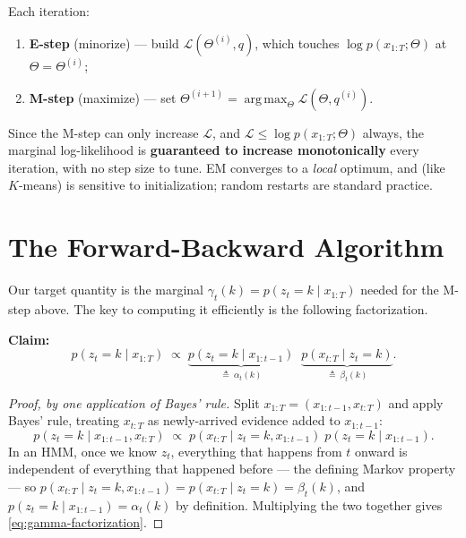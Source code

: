 \documentclass[11pt]{article}
\DeclareMathOperator*{\argmax}{arg\,max}
\begin{document}
Each iteration: 
\begin{enumerate}
  \item \textbf{E-step} (minorize) --- build
$\mathcal L(\Theta^{(i)}, q)$, which touches $\log p(x_{1:T};\Theta)$ at
$\Theta = \Theta^{(i)}$; 
  \item \textbf{M-step} (maximize) --- set
$\Theta^{(i+1)} = \argmax_\Theta \mathcal L(\Theta, q^{(i)})$. 
\end{enumerate}
Since the M-step can only increase $\mathcal L$, and $\mathcal L \leq \log
p(x_{1:T};\Theta)$ always, the marginal log-likelihood is
\textbf{guaranteed to increase monotonically} every iteration, with no step
size to tune. EM converges to a \emph{local} optimum, and (like $K$-means)
is sensitive to initialization; random restarts are standard practice.


\section{The Forward-Backward Algorithm}

Our target quantity is the marginal $\gamma_t(k) = p(z_t{=}k \mid
x_{1:T})$ needed for the M-step above. The key to computing it
efficiently is the following factorization.

\textbf{Claim:}
\begin{equation}
p(z_t{=}k \mid x_{1:T}) \;\propto\;
\underbrace{p(z_t{=}k \mid x_{1:t-1})}_{\triangleq\ \alpha_t(k)}
\;\;
\underbrace{p(x_{t:T} \mid z_t{=}k)}_{\triangleq\ \beta_t(k)}.
\label{eq:gamma-factorization}
\end{equation}

\begin{proof}[Proof, by one application of Bayes' rule]
Split $x_{1:T} = (x_{1:t-1}, x_{t:T})$ and apply Bayes' rule, treating
$x_{t:T}$ as newly-arrived evidence added to $x_{1:t-1}$:
\[
p(z_t{=}k \mid x_{1:t-1}, x_{t:T})
\;\propto\; p(x_{t:T} \mid z_t{=}k, x_{1:t-1}) \;
p(z_t{=}k \mid x_{1:t-1}).
\]
In an HMM, once we know $z_t$, everything that happens from $t$ onward is
independent of everything that happened before --- the defining Markov
property --- so $p(x_{t:T} \mid z_t{=}k, x_{1:t-1}) = p(x_{t:T}\mid
z_t{=}k) = \beta_t(k)$, and $p(z_t{=}k\mid x_{1:t-1}) = \alpha_t(k)$ by
definition. Multiplying the two together gives \eqref{eq:gamma-factorization}.
\end{proof}
\end{document}
